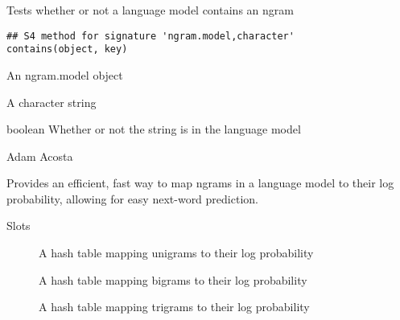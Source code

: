 \documentclass[letterpaper]{book}
\begin{document}
%
\begin{Description}\relax
Tests whether or not a language model contains an ngram
\end{Description}
%
\begin{Usage}
\begin{verbatim}
## S4 method for signature 'ngram.model,character'
contains(object, key)
\end{verbatim}
\end{Usage}
%
\begin{Arguments}
\begin{ldescription}
\item[\code{object}] An ngram.model object

\item[\code{key}] A character string
\end{ldescription}
\end{Arguments}
%
\begin{Value}
boolean Whether or not the string is in the language model
\end{Value}
%
\begin{Author}\relax
Adam Acosta
\end{Author}
%
\begin{Description}\relax
Provides an efficient, fast way to map ngrams in a language
model to their log probability, allowing for easy next-word prediction.
\end{Description}
%
\begin{Section}{Slots}

\begin{description}

\item[] A hash table mapping unigrams to their log probability

\item[] A hash table mapping bigrams to their log probability

\item[] A hash table mapping trigrams to their log probability

\end{description}
\end{Section}
\end{document}
